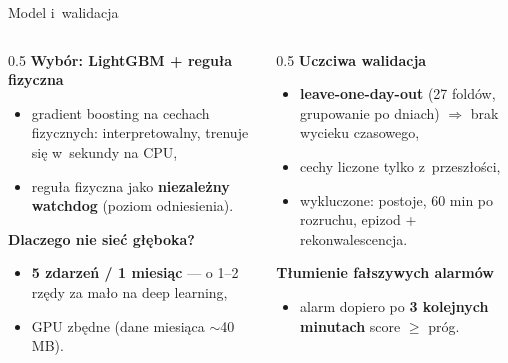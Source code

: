 \documentclass[aspectratio=169,11pt]{beamer}
\newcommand{\sig}[1]{\textcolor{akcent}{\textbf{#1}}}
\begin{document}
\begin{frame}{Model i~walidacja}
  \begin{columns}[T]
    \begin{column}{0.5\textwidth}
      \textbf{Wybór: \sig{LightGBM} + reguła fizyczna}
      \begin{itemize}\footnotesize
        \item gradient boosting na cechach fizycznych: interpretowalny, trenuje się w~sekundy na CPU,
        \item reguła fizyczna jako \sig{niezależny watchdog} (poziom odniesienia).
      \end{itemize}
      \vspace{0.4em}
      \textbf{Dlaczego nie sieć głęboka?}
      \begin{itemize}\footnotesize
        \item \sig{5 zdarzeń / 1 miesiąc} --- o 1--2 rzędy za mało na deep learning,
        \item GPU zbędne (dane miesiąca $\sim$40 MB).
      \end{itemize}
    \end{column}
    \begin{column}{0.5\textwidth}
      \textbf{Uczciwa walidacja}
      \begin{itemize}\footnotesize
        \item \sig{leave-one-day-out} (27 foldów, grupowanie po dniach) $\Rightarrow$ brak wycieku czasowego,
        \item cechy liczone tylko z~przeszłości,
        \item wykluczone: postoje, 60 min po rozruchu, epizod + rekonwalescencja.
      \end{itemize}
      \vspace{0.4em}
      \textbf{Tłumienie fałszywych alarmów}
      \begin{itemize}\footnotesize
        \item alarm dopiero po \sig{3 kolejnych minutach} score $\ge$ próg.
      \end{itemize}
    \end{column}
  \end{columns}
\end{frame}
\end{document}
